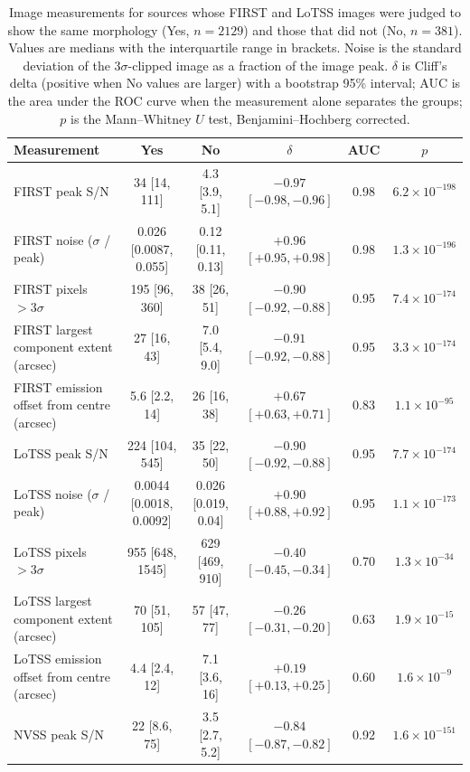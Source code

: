 \begin{table}
\centering
\caption{Image measurements for sources whose FIRST and LoTSS images were judged to show the same morphology (Yes, $n=2129$) and those that did not (No, $n=381$). Values are medians with the interquartile range in brackets. Noise is the standard deviation of the $3\sigma$-clipped image as a fraction of the image peak. $\delta$ is Cliff's delta (positive when No values are larger) with a bootstrap 95\% interval; AUC is the area under the ROC curve when the measurement alone separates the groups; $p$ is the Mann--Whitney $U$ test, Benjamini--Hochberg corrected.}
\label{tab:morphology_review}
\begin{tabular}{lccccc}
\hline
Measurement & Yes & No & $\delta$ & AUC & $p$ \\
\hline
FIRST peak S/N & 34 [14, 111] & 4.3 [3.9, 5.1] & $-0.97$ $[-0.98, -0.96]$ & 0.98 & $6.2\times10^{-198}$ \\
FIRST noise ($\sigma$ / peak) & 0.026 [0.0087, 0.055] & 0.12 [0.11, 0.13] & $+0.96$ $[+0.95, +0.98]$ & 0.98 & $1.3\times10^{-196}$ \\
FIRST pixels $>3\sigma$ & 195 [96, 360] & 38 [26, 51] & $-0.90$ $[-0.92, -0.88]$ & 0.95 & $7.4\times10^{-174}$ \\
FIRST largest component extent (arcsec) & 27 [16, 43] & 7.0 [5.4, 9.0] & $-0.91$ $[-0.92, -0.88]$ & 0.95 & $3.3\times10^{-174}$ \\
FIRST emission offset from centre (arcsec) & 5.6 [2.2, 14] & 26 [16, 38] & $+0.67$ $[+0.63, +0.71]$ & 0.83 & $1.1\times10^{-95}$ \\
LoTSS peak S/N & 224 [104, 545] & 35 [22, 50] & $-0.90$ $[-0.92, -0.88]$ & 0.95 & $7.7\times10^{-174}$ \\
LoTSS noise ($\sigma$ / peak) & 0.0044 [0.0018, 0.0092] & 0.026 [0.019, 0.04] & $+0.90$ $[+0.88, +0.92]$ & 0.95 & $1.1\times10^{-173}$ \\
LoTSS pixels $>3\sigma$ & 955 [648, 1545] & 629 [469, 910] & $-0.40$ $[-0.45, -0.34]$ & 0.70 & $1.3\times10^{-34}$ \\
LoTSS largest component extent (arcsec) & 70 [51, 105] & 57 [47, 77] & $-0.26$ $[-0.31, -0.20]$ & 0.63 & $1.9\times10^{-15}$ \\
LoTSS emission offset from centre (arcsec) & 4.4 [2.4, 12] & 7.1 [3.6, 16] & $+0.19$ $[+0.13, +0.25]$ & 0.60 & $1.6\times10^{-9}$ \\
NVSS peak S/N & 22 [8.6, 75] & 3.5 [2.7, 5.2] & $-0.84$ $[-0.87, -0.82]$ & 0.92 & $1.6\times10^{-151}$ \\

\end{tabular}
\end{table}
